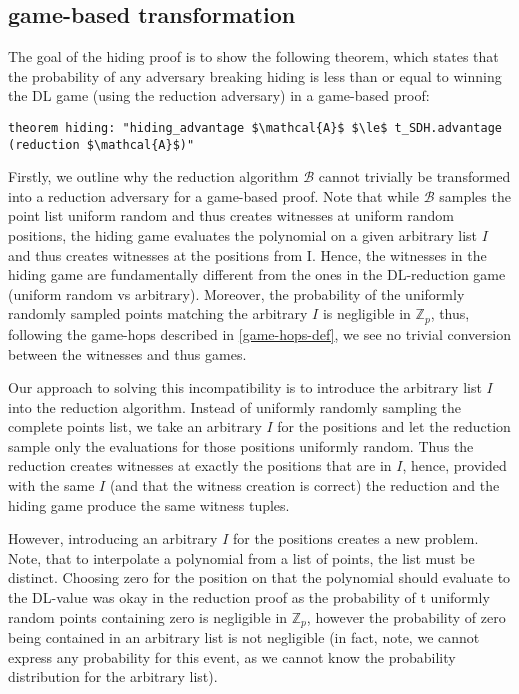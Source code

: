 \subsection{game-based transformation}
\label{security:hiding:game_based_transf}
The goal of the hiding proof is to show the following theorem, which states that the probability of any adversary breaking hiding is less than or equal to winning the DL game (using the reduction adversary) in a game-based proof:
\begin{lstlisting}[language=isabelle]
    theorem hiding: "hiding_advantage $\mathcal{A}$ $\le$ t_SDH.advantage (reduction $\mathcal{A}$)"
\end{lstlisting}

Firstly, we outline why the reduction algorithm $\mathcal{B}$ cannot trivially be transformed into a reduction adversary for a game-based proof. Note that while $\mathcal{B}$ samples the point list uniform random and thus creates witnesses at uniform random positions, the hiding game evaluates the polynomial on a given arbitrary list $I$ and thus creates witnesses at the positions from I. Hence, the witnesses in the hiding game are fundamentally different from the ones in the DL-reduction game (uniform random vs arbitrary). Moreover, the probability of the uniformly randomly sampled points matching the arbitrary $I$ is negligible in $\mathbb{Z}_p$, thus, following the game-hops described in \ref{game-hops-def}, we see no trivial conversion between the witnesses and thus games.

Our approach to solving this incompatibility is to introduce the arbitrary list $I$ into the reduction algorithm. Instead of uniformly randomly sampling the complete points list, we take an arbitrary $I$ for the positions and let the reduction sample only the evaluations for those positions uniformly random. Thus the reduction creates witnesses at exactly the positions that are in $I$, hence, provided with the same $I$  (and that the witness creation is correct) the reduction and the hiding game produce the same witness tuples.

However, introducing an arbitrary $I$ for the positions creates a new problem. Note, that to interpolate a polynomial from a list of points, the list must be distinct. Choosing zero for the position on that the polynomial should evaluate to the DL-value was okay in the reduction proof as the probability of t uniformly random points containing zero is negligible in $\mathbb{Z}_p$, however the probability of zero being contained in an arbitrary list is not negligible (in fact, note, we cannot express any probability for this event, as we cannot know the probability distribution for the arbitrary list).


